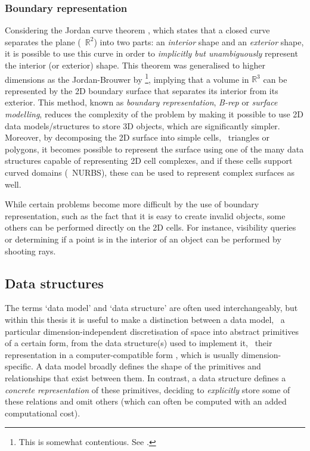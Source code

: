 \subsubsection{Boundary representation}

Considering the Jordan curve theorem \citep{Jordan87}, which states that a closed curve separates the plane (\ie\ $\mathbb{R}^2$) into two parts: an \emph{interior} shape and an \emph{exterior} shape, it is possible to use this curve in order to \emph{implicitly but unambiguously} represent the interior (or exterior) shape.
This theorem was generalised to higher dimensions as the Jordan-Brouwer by \citet{Lebesgue11,Brouwer11}\footnote{This is somewhat contentious. See \citet[Ch.~5]{van-Dalen13}.}, implying that a volume in $\mathbb{R}^3$ can be represented by the 2D boundary surface that separates its interior from its exterior.
This method, known as \emph{boundary representation}, \emph{B-rep} or \emph{surface modelling}, reduces the complexity of the problem by making it possible to use 2D data models/structures to store 3D objects, which are significantly simpler.
Moreover, by decomposing the 2D surface into simple cells, \eg\ triangles or polygons, it becomes possible to represent the surface using one of the many data structures capable of representing 2D cell complexes, and if these cells support curved domains (\eg\ NURBS), these can be used to represent complex surfaces as well.

While certain problems become more difficult by the use of boundary representation, such as the fact that it is easy to create invalid objects, some others can be performed directly on the 2D cells.
For instance, visibility queries or determining if a point is in the interior of an object can be performed by shooting rays.

\subsection{Data structures}
\label{ss:data-structures}

The terms `data model' and `data structure' are often used interchangeably, but within this thesis it is useful to make a distinction between a data model, \ie\ a particular dimension-independent discretisation of space into abstract primitives of a certain form, from the data structure(s) used to implement it, \ie\ their representation in a computer-compatible form \citep{Frank92}, which is usually dimension-specific.
A data model broadly defines the shape of the primitives and relationships that exist between them.
In contrast, a data structure defines a \emph{concrete representation} of these primitives, deciding to \emph{explicitly} store some of these relations and omit others (which can often be computed with an added computational cost).

